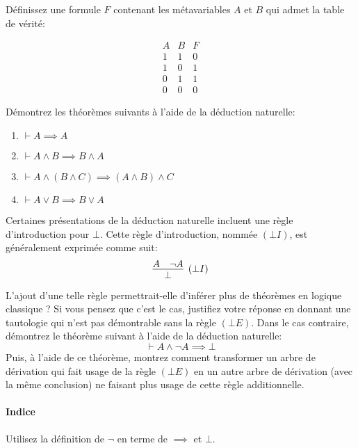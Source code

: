 \documentclass[12pt,french,a4paper]{article}
\begin{document}
\vspace{1cm}

\begin{question}
Définissez une formule $F$ contenant les métavariables $A$ et $B$ qui admet la table de vérité:

\begin{displaymath}
\begin{array}{cc|c}
A & B & F\\
\hline
1 & 1 & 0\\
1 & 0 & 1\\
0 & 1 & 1\\
0 & 0 & 0
\end{array}
\end{displaymath}

\end{question}

\vspace{1cm}

\begin{question}
Démontrez les théorèmes suivants à l'aide de la déduction naturelle:
\begin{enumerate}
\item $\vdash A \implies A$
\item $\vdash A \wedge B \implies B \wedge A$
\item $\vdash A \wedge (B \wedge C) \implies (A \wedge B) \wedge C$
\item $\vdash A \vee B \implies B \vee A$
\end{enumerate}
\end{question}

\newpage

\begin{question}
Certaines présentations de la déduction naturelle incluent une règle d'introduction pour $\bot$.
Cette règle d'introduction, nommée $({\bot}I)$, est généralement exprimée comme suit:
\[
\infer[({\bot}I)]{\bot}{A & \neg A}
\]

\vspace{1cm}

L'ajout d'une telle règle permettrait-elle d'inférer plus de théorèmes en logique classique ?
Si vous pensez que c'est le cas, justifiez votre réponse en donnant une tautologie qui n'est pas démontrable sans la règle $({\bot}E)$.
Dans le cas contraire, démontrez le théorème suivant à l'aide de la déduction naturelle:
\[
\vdash A \wedge \neg A \implies \bot
\]
Puis, à l'aide de ce théorème, montrez comment transformer un arbre de dérivation qui fait usage de la règle $({\bot}E)$ en un autre arbre de dérivation (avec la même conclusion) ne faisant plus usage de cette règle additionnelle.

\paragraph{Indice} Utilisez la définition de ${\neg}$ en terme de ${\implies}$ et $\bot$.

\end{question}
\end{document}
